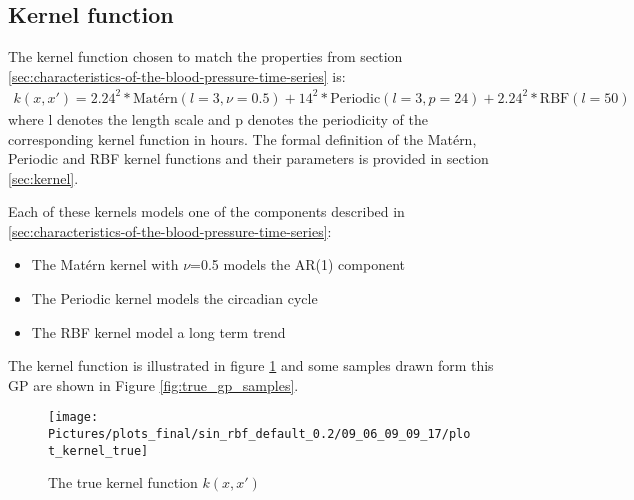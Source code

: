 \subsection{Kernel function}
The kernel function chosen to match the properties from
section \ref{sec:characteristics-of-the-blood-pressure-time-series} is:
\begin{gather*}\label{def:true_gp}
k(x, x') = 2.24^{2} * \text{Matérn}(l=3, \nu=0.5) +
14^{2} * \text{Periodic}(l=3, p=24) +  2.24^{2} * \text{RBF}(l=50)
\end{gather*}
where l denotes the length scale and p denotes the periodicity
of the corresponding kernel function in hours.
The formal definition of the Matérn, Periodic and RBF kernel
functions and their parameters is provided in section \ref{sec:kernel}.

Each of these kernels models one of the components described in
\ref{sec:characteristics-of-the-blood-pressure-time-series}:
\begin{itemize}
    \item The Matérn kernel with $\nu$=0.5 models the AR(1) component
    \item The Periodic kernel models the circadian cycle
    \item The RBF kernel model a long term trend
\end{itemize}

The kernel function is illustrated in figure \ref{fig:true_kernel} and
some samples drawn form this GP are shown in Figure \ref{fig:true_gp_samples}.

\begin{figure}[!h]
    \centering
    \texttt{[image: Pictures/plots\_final/sin\_rbf\_default\_0.2/09\_06\_09\_09\_17/plot\_kernel\_true]}
    \caption{The true kernel function $k(x,x')$}
    \label{fig:true_kernel}
\end{figure}

